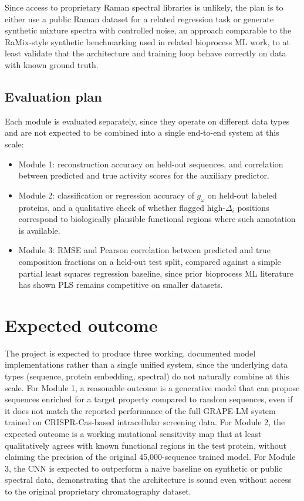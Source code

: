 \documentclass[11pt,a4paper]{article}
\begin{document}
Since access to proprietary Raman spectral libraries is unlikely, the plan is to either use a public Raman dataset for a related regression task or generate synthetic mixture spectra with controlled noise, an approach comparable to the RaMix-style synthetic benchmarking used in related bioprocess ML work, to at least validate that the architecture and training loop behave correctly on data with known ground truth.

\subsection{Evaluation plan}

Each module is evaluated separately, since they operate on different data types and are not expected to be combined into a single end-to-end system at this scale:

\begin{itemize}
\item Module 1: reconstruction accuracy on held-out sequences, and correlation between predicted and true activity scores for the auxiliary predictor.
\item Module 2: classification or regression accuracy of $g_\omega$ on held-out labeled proteins, and a qualitative check of whether flagged high-$\Delta_i$ positions correspond to biologically plausible functional regions where such annotation is available.
\item Module 3: RMSE and Pearson correlation between predicted and true composition fractions on a held-out test split, compared against a simple partial least squares regression baseline, since prior bioprocess ML literature has shown PLS remains competitive on smaller datasets.
\end{itemize}

\section{Expected outcome}

The project is expected to produce three working, documented model implementations rather than a single unified system, since the underlying data types (sequence, protein embedding, spectral) do not naturally combine at this scale. For Module 1, a reasonable outcome is a generative model that can propose sequences enriched for a target property compared to random sequences, even if it does not match the reported performance of the full GRAPE-LM system trained on CRISPR-Cas-based intracellular screening data. For Module 2, the expected outcome is a working mutational sensitivity map that at least qualitatively agrees with known functional regions in the test protein, without claiming the precision of the original 45,000-sequence trained model. For Module 3, the CNN is expected to outperform a naive baseline on synthetic or public spectral data, demonstrating that the architecture is sound even without access to the original proprietary chromatography dataset.
\end{document}
